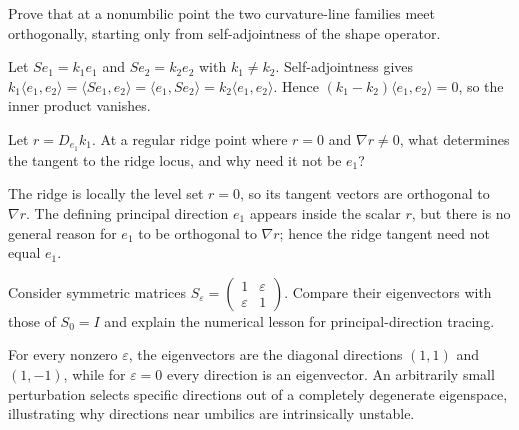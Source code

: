 \begin{problem}\label{prob:vii42-ch01}
Prove that at a nonumbilic point the two curvature-line families meet orthogonally, starting only from self-adjointness of the shape operator.
\end{problem}

\begin{solution}
Let \(Se_1=k_1e_1\) and \(Se_2=k_2e_2\) with \(k_1\ne k_2\).  Self-adjointness gives \(k_1\langle e_1,e_2\rangle=\langle Se_1,e_2\rangle=\langle e_1,Se_2\rangle=k_2\langle e_1,e_2\rangle\).  Hence \((k_1-k_2)\langle e_1,e_2\rangle=0\), so the inner product vanishes.
\end{solution}

\begin{problem}\label{prob:vii42-ch02}
Let \(r=D_{e_1}k_1\).  At a regular ridge point where \(r=0\) and \(\nabla r\ne0\), what determines the tangent to the ridge locus, and why need it not be \(e_1\)?
\end{problem}

\begin{solution}
The ridge is locally the level set \(r=0\), so its tangent vectors are orthogonal to \(\nabla r\).  The defining principal direction \(e_1\) appears inside the scalar \(r\), but there is no general reason for \(e_1\) to be orthogonal to \(\nabla r\); hence the ridge tangent need not equal \(e_1\).
\end{solution}

\begin{problem}\label{prob:vii42-ch03}
Consider symmetric matrices \(S_\varepsilon=\begin{pmatrix}1&\varepsilon\\\varepsilon&1\end{pmatrix}\).  Compare their eigenvectors with those of \(S_0=I\) and explain the numerical lesson for principal-direction tracing.
\end{problem}

\begin{solution}
For every nonzero \(\varepsilon\), the eigenvectors are the diagonal directions \((1,1)\) and \((1,-1)\), while for \(\varepsilon=0\) every direction is an eigenvector.  An arbitrarily small perturbation selects specific directions out of a completely degenerate eigenspace, illustrating why directions near umbilics are intrinsically unstable.
\end{solution}

